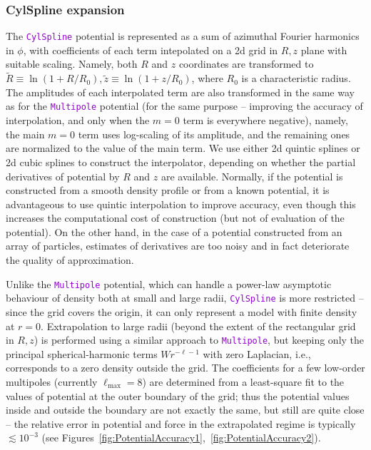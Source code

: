 \documentclass[12pt]{article}
\newcommand{\ttt}[1]{\textcolor{darkviolet}{\texttt{#1}}}
\begin{document}
\subsubsection{CylSpline expansion}  \label{sec:PotentialCylSplineDetails}

The \ttt{CylSpline} potential is represented as a sum of azimuthal Fourier harmonics in $\phi$, with coefficients of each term intepolated on a 2d grid in $R,z$ plane with suitable scaling.
Namely, both $R$ and $z$ coordinates are transformed to $\tilde R \equiv \ln(1+R/R_0), \tilde z \equiv \ln(1+z/R_0)$, where $R_0$ is a characteristic radius. The amplitudes of each interpolated term are also transformed in the same way as for the \ttt{Multipole} potential (for the same purpose -- improving the accuracy of interpolation, and only when the $m=0$ term is everywhere negative), namely, the main $m=0$ term uses log-scaling of its amplitude, and the remaining ones are normalized to the value of the main term. We use either 2d quintic splines or 2d cubic splines to construct the interpolator, depending on whether the partial derivatives of potential by $R$ and $z$ are available. Normally, if the potential is constructed from a smooth density profile or from a known potential, it is advantageous to use quintic interpolation to improve accuracy, even though this increases the computational cost of construction (but not of evaluation of the potential). On the other hand, in the case of a potential constructed from an array of particles, estimates of derivatives are too noisy and in fact deteriorate the quality of approximation.

Unlike the \ttt{Multipole} potential, which can handle a power-law asymptotic behaviour of density both at small and large radii, \ttt{CylSpline} is more restricted -- since the grid covers the origin, it can only represent a model with finite density at $r=0$. Extrapolation to large radii (beyond the extent of the rectangular grid in $R,z$) is performed using a similar approach to \ttt{Multipole}, but keeping only the principal spherical-harmonic terms $W r^{-\ell-1}$ with zero Laplacian, i.e., corresponds to a zero density outside the grid. The coefficients for a few low-order multipoles (currently $\ell_\mathrm{max}=8$) are determined from a least-square fit to the values of potential at the outer boundary of the grid; thus the potential values inside and outside the boundary are not exactly the same, but still are quite close -- the relative error in potential and force in the extrapolated regime is typically $\lesssim 10^{-3}$ (see Figures~\ref{fig:PotentialAccuracy1},~\ref{fig:PotentialAccuracy2}).
\end{document}
